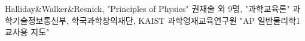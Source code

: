 \documentclass[article,chapter,openany,amsmath,gremph,lwarp]{oblivoir}
\makeatletter
\newlength{\numberheight}
\newlength{\barlength}
\renewcommand{\chapnamefont}{\normalfont\LARGE\flushright}
\renewcommand{\chapnumfont}{\normalfont\HUGE}
\renewcommand{\prechapternum}{%
            \chapnamefont\MakeUppercase{chapter}}
\renewcommand{\postchapternum}{}%
\renewcommand{\printchapternum}{%
      \makebox[0pt][l]{%
      \hspace{.8em}%
      \resizebox{!}{\numberheight}{\chapnumfont \thechapter}%
      \hspace{.8em}%
      \rule{\barlength}{\numberheight}
     }
   }
\renewcommand*{\chapnamefont}{\normalfont\LARGE\scshape}
\renewcommand*{\prechapternum}{\raggedleft\chapnamefont \pre@chapter}
\renewcommand*{\chapnumfont}{\normalfont\Huge}
\newif\if@showcommand\@showcommandtrue
\newcommand\showcommand[1]{%
	\if@showcommand
	 \checkoddpage\ifoddpage
      \marginpar{\small\texttt{\textbackslash #1}}%
   \else
      \marginpar{\hfill\small\texttt{\textbackslash #1}}%
   \fi
	\fi
}
\makeatother
\begin{document}
\def\partmark#1{\markboth{#1}{#1}}
\def\chaptermark#1{\markright{#1}}
%
\AppendixTitleToToc
\AttachAppendixTitleToSecnum
\appendix
\appendixpage*
\renewcommand{}
\renewcommand\thesubsection{\thesection.\arabic{APPsubsection}}
\setcounter{APPchapter}{0}
\renewcommand*\prechapternum{\chapnamefont 부록\ \ 제}
\renewcommand*\postchapternum{\chapnamefont 장}
\renewcommand*\printchapternum{\chapnumfont\thechapter}








\backmatter
{}

\renewcommand\prebibhook{}
\begin{thebibliography}{00}
 Halliday\&Walker\&Resnick, "Principles of Physics"
 권재술 외 9명, "과학교육론"
 과학기술정보통신부, 학국과학창의재단, KAIST 과학영재교육연구원 "AP 일반물리학1 교사용 지도"
\end{thebibliography}

\indexintoc 
\renewcommand\preindexhook{%
  찾아보기는 테스트를 위해서 임의의 단어들로 선정되었다.
  \bigskip}
\printindex

\end{document}

